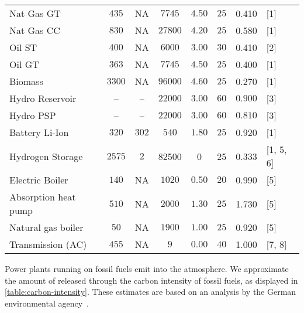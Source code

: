 \documentclass[review, 3p, times, 12pt, authoryear]{elsarticle}
\begin{document}
\begin{ThreePartTable}
\begin{longtable}{l ccc ccc l}
            Nat Gas GT                & $435$          & NA       & $7745$       & $4.50$   & $25$  & 0.410                    & [1]       \\
            Nat Gas CC                & $830$          & NA       & $27800$      & $4.20$   & $25$  & 0.580                    & [1]       \\
            Oil ST                    & $400$          & NA       & $6000$       & $3.00$   & $30$  & 0.410                    & [2]       \\
            Oil GT                    & $363$          & NA       & $7745$       & $4.50$   & $25$  & 0.400                    & [1]       \\
            Biomass                   & $3300$         & NA       & $96000$      & $4.60$   & $25$  & 0.270                    & [1]       \\ \midrule
            Hydro Reservoir           & --             & --       & $22000$      & $3.00$   & $60$  & $0.900$\tnote{$\dagger$} & [3]       \\
            Hydro PSP                 & --             & --       & $22000$      & $3.00$   & $60$  & $0.810$\tnote{$\dagger$} & [3]       \\
            Battery Li-Ion            & $320$          & $302$    & $540$        & $1.80$   & $25$  & 0.920                    & [1]       \\
            Hydrogen Storage\tnote{a} & $2575$         & $2$      & 82500        & 0        & 25    & 0.333                    & [1, 5, 6] \\ \midrule
            Electric Boiler           & $140$          & NA       & $1020$       & $0.50$   & $20$  & 0.990                    & [5]       \\
            Absorption heat pump      & $510$          & NA       & $2000$       & $1.30$   & $25$  & 1.730                    & [5]       \\
            Natural gas boiler        & $50$           & NA       & $1900$       & $1.00$   & $25$  & 0.920\tnote{b}           & [5]       \\ \midrule
            Transmission (AC)         & $455$\tnote{c} & NA       & $9$\tnote{c} & $0.00$   & $40$  & 1.000                    & [7, 8]    \\
        \end{longtable}
    \end{ThreePartTable}

    Power plants running on fossil fuels emit  into the atmosphere.
    We approximate the amount of  released through the carbon intensity of fossil fuels, as displayed in \autoref{table:carbon-intensity}.
    These estimates are based on an analysis by the German environmental agency~\citep{Juhrich2016}.
\end{document}
